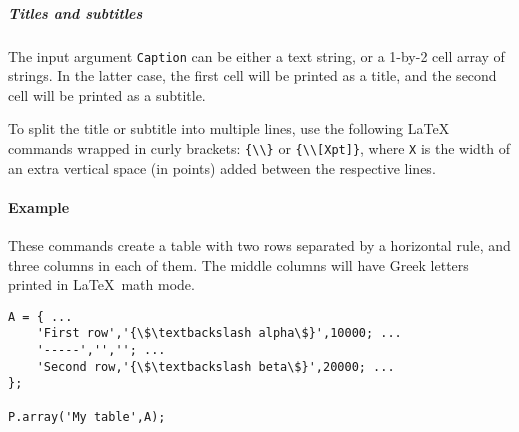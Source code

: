 \subparagraph{Titles and subtitles}\label{titles-and-subtitles}

The input argument \texttt{Caption} can be either a text string, or a
1-by-2 cell array of strings. In the latter case, the first cell will be
printed as a title, and the second cell will be printed as a subtitle.

To split the title or subtitle into multiple lines, use the following
LaTeX commands wrapped in curly brackets:
\texttt{\{\textbackslash{}\textbackslash{}\}} or
\texttt{\{\textbackslash{}\textbackslash{}{[}Xpt{]}\}}, where \texttt{X}
is the width of an extra vertical space (in points) added between the
respective lines.

\paragraph{Example}\label{example}

These commands create a table with two rows separated by a horizontal
rule, and three columns in each of them. The middle columns will have
Greek letters printed in \LaTeX~math mode.

\begin{verbatim}
A = { ...
    'First row','{\$\textbackslash alpha\$}',10000; ...
    '-----','',''; ...
    'Second row,'{\$\textbackslash beta\$}',20000; ...
};

P.array('My table',A);
\end{verbatim}


